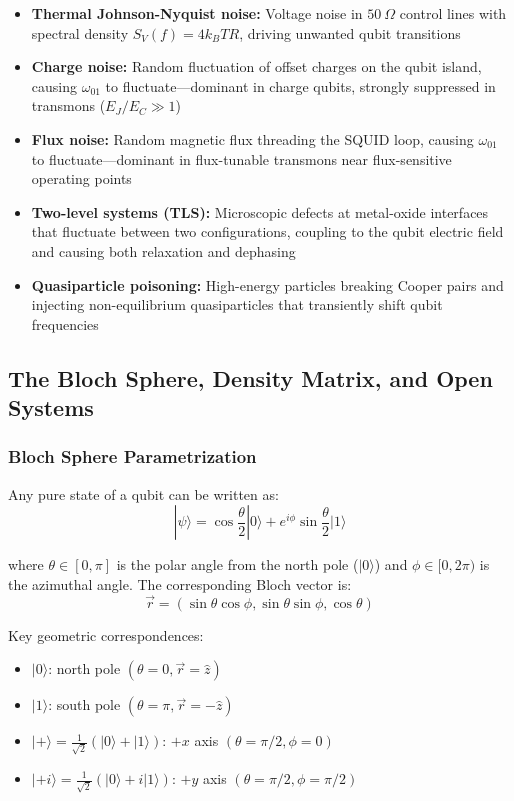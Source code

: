 \documentclass{article}
\begin{document}
\begin{itemize}
    \item \textbf{Thermal Johnson-Nyquist noise:} Voltage noise in $50~\Omega$ control lines with spectral density $S_V(f) = 4k_B T R$, driving unwanted qubit transitions
    \item \textbf{Charge noise:} Random fluctuation of offset charges on the qubit island, causing $\omega_{01}$ to fluctuate—dominant in charge qubits, strongly suppressed in transmons ($E_J/E_C \gg 1$)
    \item \textbf{Flux noise:} Random magnetic flux threading the SQUID loop, causing $\omega_{01}$ to fluctuate—dominant in flux-tunable transmons near flux-sensitive operating points
    \item \textbf{Two-level systems (TLS):} Microscopic defects at metal-oxide interfaces that fluctuate between two configurations, coupling to the qubit electric field and causing both relaxation and dephasing
    \item \textbf{Quasiparticle poisoning:} High-energy particles breaking Cooper pairs and injecting non-equilibrium quasiparticles that transiently shift qubit frequencies
\end{itemize}

\subsection{The Bloch Sphere, Density Matrix, and Open Systems}

\subsubsection*{Bloch Sphere Parametrization}

Any pure state of a qubit can be written as:
$$|\psi\rangle = \cos\frac{\theta}{2}|0\rangle + e^{i\phi}\sin\frac{\theta}{2}|1\rangle$$

where $\theta \in [0, \pi]$ is the polar angle from the north pole ($|0\rangle$) and $\phi \in [0, 2\pi)$ is the azimuthal angle. The corresponding Bloch vector is:
$$\vec{r} = (\sin\theta\cos\phi, \sin\theta\sin\phi, \cos\theta)$$

Key geometric correspondences:
\begin{itemize}
    \item $|0\rangle$: north pole $(\theta=0, \vec{r} = \hat{z})$
    \item $|1\rangle$: south pole $(\theta=\pi, \vec{r} = -\hat{z})$
    \item $|+\rangle = \frac{1}{\sqrt{2}}(|0\rangle+|1\rangle)$: $+x$ axis $(\theta=\pi/2, \phi=0)$
    \item $|+i\rangle = \frac{1}{\sqrt{2}}(|0\rangle+i|1\rangle)$: $+y$ axis $(\theta=\pi/2, \phi=\pi/2)$
\end{itemize}
\end{document}
